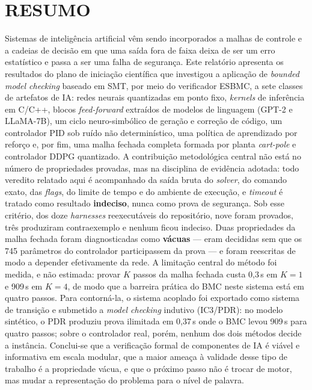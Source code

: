\clearpage
{}
{}
\section*{RESUMO}

Sistemas de inteligência artificial vêm sendo incorporados a malhas de controle e a
cadeias de decisão em que uma saída fora de faixa deixa de ser um erro estatístico e
passa a ser uma falha de segurança. Este relatório apresenta os resultados do plano de
iniciação científica que investigou a aplicação de \textit{bounded model checking}
baseado em SMT, por meio do verificador ESBMC, a sete classes de artefatos de IA:
redes neurais quantizadas em ponto fixo, \textit{kernels} de inferência em C/C++,
blocos \textit{feed-forward} extraídos de modelos de linguagem (GPT-2 e LLaMA-7B),
um ciclo neuro-simbólico de geração e correção de código, um controlador PID sob ruído
não determinístico, uma política de aprendizado por reforço e, por fim, uma malha
fechada completa formada por planta \textit{cart-pole} e controlador DDPG quantizado.
A contribuição metodológica central não está no número de propriedades provadas, mas na
disciplina de evidência adotada: todo veredito relatado aqui é acompanhado da saída
bruta do \textit{solver}, do comando exato, das \textit{flags}, do limite de tempo e do
ambiente de execução, e \textit{timeout} é tratado como resultado \textbf{indeciso},
nunca como prova de segurança. Sob esse critério, dos doze \textit{harnesses}
reexecutáveis do repositório, nove foram provados, três produziram contraexemplo e
nenhum ficou indeciso. Duas propriedades da malha fechada foram diagnosticadas como
\textbf{vácuas} --- eram decididas sem que os 745 parâmetros do controlador
participassem da prova --- e foram reescritas de modo a depender efetivamente da rede.
A limitação central do método foi medida, e não estimada: provar $K$ passos da malha
fechada custa 0,3\,s em $K{=}1$ e 909\,s em $K{=}4$, de modo que a barreira prática do
BMC neste sistema está em quatro passos. Para contorná-la, o sistema acoplado foi
exportado como sistema de transição e submetido a \textit{model checking} indutivo
(IC3/PDR): no modelo sintético, o PDR produziu prova ilimitada em 0,37\,s onde o BMC
levou 909\,s para quatro passos; sobre o controlador real, porém, nenhum dos dois
métodos decide a instância. Conclui-se que a verificação formal de componentes de IA é
viável e informativa em escala modular, que a maior ameaça à validade desse tipo de
trabalho é a propriedade vácua, e que o próximo passo não é trocar de motor, mas mudar
a representação do problema para o nível de palavra.

